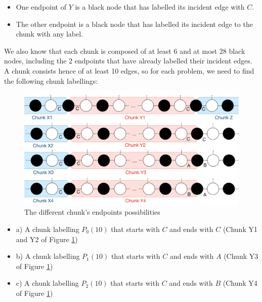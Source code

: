     \begin{itemize}
        \item One endpoint of $Y$ is a black node that has labelled its incident edge with $C$.
        \item The other endpoint is a black node that has labelled its incident edge to the chunk with any label. 
    \end{itemize}
    We also know that each chunk is composed of at least 6 and at most $28$ black nodes, including the 2 endpoints that have already labelled their incident edges.
    A chunk consists hence of at least 10 edges, so for each problem, we need to find the following chunk labellings:
\begin{figure}[htb]
    \centering
    \includegraphics[scale = 0.22]{Figures/rcp_explain.pdf}
    \caption{The different chunk's endpoints possibilities}
    \label{fig:global_1}
\end{figure}
\begin{itemize}
    \item a) A chunk labelling $P_0(10)$ that starts with $C$ and ends with $C$ (Chunk Y1 and Y2 of Figure \ref{fig:global_1})
    \item b) A chunk labelling $P_1(10)$ that starts with $C$ and ends with $A$ (Chunk Y3 of Figure \ref{fig:global_1})
    \item c) A chunk labelling $P_2(10)$ that starts with $C$ and ends with $B$ (Chunk Y4 of Figure \ref{fig:global_1})
\end{itemize}

